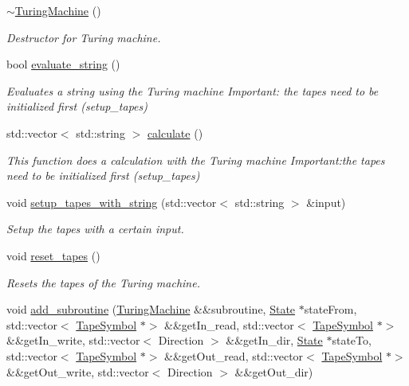 \begin{DoxyCompactItemize}
\hyperlink{classTuringMachine_a5279d180cd87e664447c6b40e0ce55e2}{$\sim$\+Turing\+Machine} ()
\begin{DoxyCompactList}\small\item\em Destructor for Turing machine. \end{DoxyCompactList}\item 
bool \hyperlink{classTuringMachine_a6ac17dcb3bce76b6e02154cb749526c4}{evaluate\+\_\+string} ()
\begin{DoxyCompactList}\small\item\em Evaluates a string using the Turing machine Important\+: the tapes need to be initialized first (setup\+\_\+tapes) \end{DoxyCompactList}\item 
std\+::vector$<$ std\+::string $>$ \hyperlink{classTuringMachine_a103fa5e9b267ea625770297cb9168a34}{calculate} ()
\begin{DoxyCompactList}\small\item\em This function does a calculation with the Turing machine Important\+:the tapes need to be initialized first (setup\+\_\+tapes) \end{DoxyCompactList}\item 
void \hyperlink{classTuringMachine_add19f4c90678b56d5a78d0e88c389cd8}{setup\+\_\+tapes\+\_\+with\+\_\+string} (std\+::vector$<$ std\+::string $>$ \&input)
\begin{DoxyCompactList}\small\item\em Setup the tapes with a certain input. \end{DoxyCompactList}\item 
\mbox{\label{classTuringMachine_a6423abd83f107001747c544fbd111be3}} 
void \hyperlink{classTuringMachine_a6423abd83f107001747c544fbd111be3}{reset\+\_\+tapes} ()
\begin{DoxyCompactList}\small\item\em Resets the tapes of the Turing machine. \end{DoxyCompactList}\item 
void \hyperlink{classTuringMachine_a15485e4e3a38f21581f0d13127b6e6f7}{add\+\_\+subroutine} (\hyperlink{classTuringMachine}{Turing\+Machine} \&\&subroutine, \hyperlink{classState}{State} $\ast$state\+From, std\+::vector$<$ \hyperlink{classTapeSymbol}{Tape\+Symbol} $\ast$$>$ \&\&get\+In\+\_\+read, std\+::vector$<$ \hyperlink{classTapeSymbol}{Tape\+Symbol} $\ast$$>$ \&\&get\+In\+\_\+write, std\+::vector$<$ Direction $>$ \&\&get\+In\+\_\+dir, \hyperlink{classState}{State} $\ast$state\+To, std\+::vector$<$ \hyperlink{classTapeSymbol}{Tape\+Symbol} $\ast$$>$ \&\&get\+Out\+\_\+read, std\+::vector$<$ \hyperlink{classTapeSymbol}{Tape\+Symbol} $\ast$$>$ \&\&get\+Out\+\_\+write, std\+::vector$<$ Direction $>$ \&\&get\+Out\+\_\+dir)

\end{DoxyCompactItemize}
